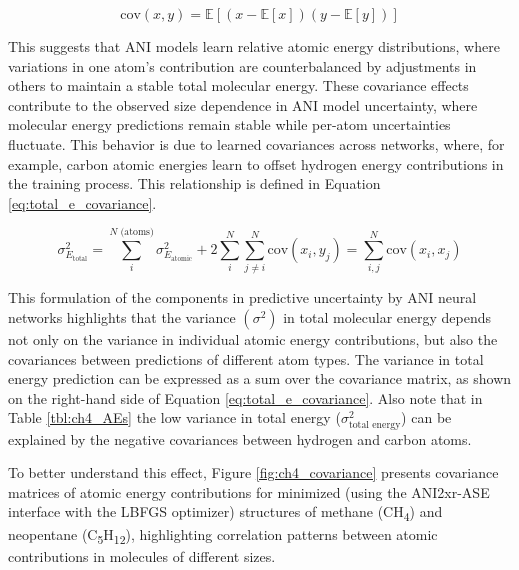\begin{equation}
    \label{eq:covariance}
    \text{cov}(x, y) = \mathbb{E}[(x - \mathbb{E}[x])(y - \mathbb{E}[y])]
\end{equation}

This suggests that ANI models learn relative atomic energy distributions, where variations in one atom's contribution are counterbalanced by adjustments in others to maintain a stable total molecular energy. 
These covariance effects contribute to the observed size dependence in ANI model uncertainty, where molecular energy predictions remain stable while per-atom uncertainties fluctuate.
This behavior is due to learned covariances across networks, where, for example, carbon atomic energies learn to offset hydrogen energy contributions in the training process. This relationship is defined in Equation \ref{eq:total_e_covariance}.

\begin{equation}
    \sigma_{E_{\text{total}}}^2 = \sum_i^{N \text{ (atoms)}} \sigma_{E_{\text{atomic}}}^2 + 2 \sum_i^N \sum_{j \neq i}^N \text{cov}(x_i, y_j) = \sum_{i,j}^N \text{cov}(x_i, x_j)
    \label{eq:total_e_covariance}
\end{equation}

This formulation of the components in predictive uncertainty by ANI neural networks highlights that the variance $\left( \sigma^2 \right)$ in total molecular energy depends not only on the variance in individual atomic energy contributions, but also the covariances between predictions of different atom types.
The variance in total energy prediction can be expressed as a sum over the covariance matrix, as shown on the right-hand side of Equation \ref{eq:total_e_covariance}. 
Also note that in Table \ref{tbl:ch4_AEs} the low variance in  total energy ($\sigma^2_{\text{total energy}}$) can be explained by the negative covariances between hydrogen and carbon atoms.

To better understand this effect, Figure \ref{fig:ch4_covariance} presents covariance matrices of atomic energy contributions for minimized (using the ANI2xr-ASE interface with the LBFGS \cite{LBFGS} optimizer) structures of methane (CH\textsubscript{4}) and neopentane (C\textsubscript{5}H\textsubscript{12}), highlighting correlation patterns between atomic contributions in molecules of different sizes.


